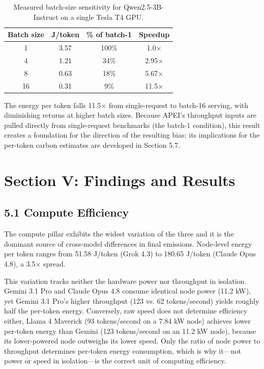 \documentclass[11pt]{article}
\begin{document}
\begin{table}[htbp]
  \centering
  \begin{tabular}{@{}c c c c@{}}
    \toprule
    \textbf{Batch size} & \textbf{J/token} & \textbf{\% of batch-1} & \textbf{Speedup} \\
    \midrule
    1  & 3.57 & 100\% & 1.0$\times$ \\
    4  & 1.21 & 34\%  & 2.95$\times$ \\
    8  & 0.63 & 18\%  & 5.67$\times$ \\
    16 & 0.31 & 9\%   & 11.5$\times$ \\
    \bottomrule
  \end{tabular}
  \caption{Measured batch-size sensitivity for Qwen2.5-3B-Instruct on a single Tesla T4 GPU.}
  \label{tab:batch-size-sensitivity}
\end{table}

The energy per token falls 11.5$\times$ from single-request to batch-16 serving, with diminishing returns at higher batch sizes. Because APEI's throughput inputs are pulled directly from single-request benchmarks (the batch-1 condition), this result creates a foundation for the direction of the resulting bias; its implications for the per-token carbon estimates are developed in Section 5.7.

\section*{Section V: Findings and Results}

\subsection*{5.1 Compute Efficiency}

The compute pillar exhibits the widest variation of the three and it is the dominant source of cross-model differences in final emissions. Node-level energy per token ranges from 51.58 J/token (Grok 4.3) to 180.65 J/token (Claude Opus 4.8), a 3.5$\times$ spread.

This variation tracks neither the hardware power nor throughput in isolation. Gemini 3.1 Pro and Claude Opus 4.8 consume identical node power (11.2 kW), yet Gemini 3.1 Pro's higher throughput (123 vs. 62 tokens/second) yields roughly half the per-token energy. Conversely, raw speed does not determine efficiency either, Llama 4 Maverick (93 tokens/second on a 7.84 kW node) achieves lower per-token energy than Gemini (123 tokens/second on an 11.2 kW node), because its lower-powered node outweighs its lower speed. Only the ratio of node power to throughput determines per-token energy consumption, which is why it---not power or speed in isolation---is the correct unit of computing efficiency.
\end{document}
